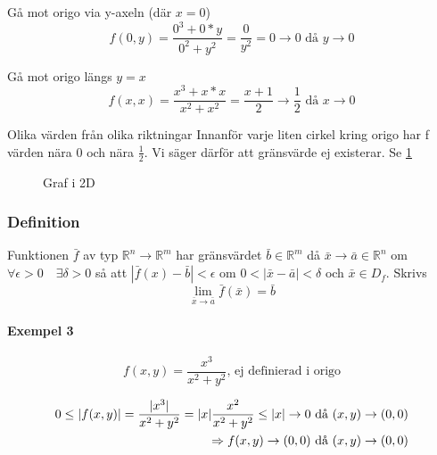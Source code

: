 \documentclass{article}
\DeclarePairedDelimiter \abs{\lvert}{\rvert}
\begin{document}
Gå mot origo via y-axeln (där $x=0$)
\[f(0,y) = \frac{0^3+0*y}{0^2+y^2} = \frac{0}{y^2} =  {0 \rightarrow 0} \text{ då } {y \rightarrow 0}\]

Gå mot origo längs $y=x$
\[f(x,x) = \frac{x^3+x*x}{x^2+x^2} = {\frac{x+1}{2} \rightarrow \frac{1}{2}} \text{ då } {x \rightarrow 0}\]

Olika värden från olika riktningar \newline
Innanför varje liten cirkel kring origo har f värden nära 0 och nära $\frac{1}{2}$.
Vi säger därför att gränsvärde ej existerar. Se \ref{fig:1}

\begin{figure}[ht] 
  \caption{Graf i 2D} \label{fig:1}
\end{figure}

\newpage
\subsubsection{Definition}

Funktionen \(\bar{f}\) av typ \(\mathbb{R}^n \rightarrow \mathbb{R}^m\) har gränsvärdet \(\bar{b} \in \mathbb{R}^m\) då \(\bar{x} \rightarrow \bar{a} \in \mathbb{R}^n\) om \(\forall \epsilon >0 \quad \exists \delta >0\) så att \(|\bar{f}(x)-\bar{b}|<\epsilon\) om \(0<|\bar{x}-\bar{a}|<\delta\) och \(\bar{x}\in D_f\). 
Skrivs 
\[
\lim_{\bar{x} \rightarrow \bar{a}} \bar{f}(\bar{x})=\bar{b}
\]

\newpage
\paragraph{Exempel 3}
\begin{equation} \label{eq:3}
	f(x,y)=\frac{x^3}{x^2+y^2} \text{, ej definierad i origo}
\end{equation}

\[
\begin{split}
0 \leq \abs{f(x,y)} = \frac{\abs{x^3}}{x^2+y^2} = \abs{x}\frac{x^2}{x^2+y^2} \leq \abs{x} \rightarrow 0 \text{ då } (x,y) \rightarrow (0,0) \\
\Rightarrow f(x,y) \rightarrow (0,0) \text{ då } (x,y) \rightarrow (0,0)
\end{split}
\]
\end{document}
